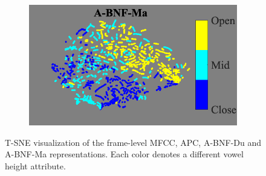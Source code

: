 \documentclass[transmag]{IEEEtran}
\begin{document}
\begin{figure}[!t]
\begin{subfigure}{0.49\linewidth}
    \end{subfigure}    \begin{subfigure}{0.49\linewidth}
	   \centering
	   \includegraphics[width=1\linewidth]{tsne_af_height_bnf_aidatatang_apc_input_disc_bar_adjust_journal.png}
    \end{subfigure}
    \caption{T-SNE visualization of the frame-level MFCC, APC, A-BNF-Du and A-BNF-Ma representations. Each color denotes a different vowel height attribute.}
        \label{fig:analysis_tsne_vowel_height}
\end{figure}
\end{document}

